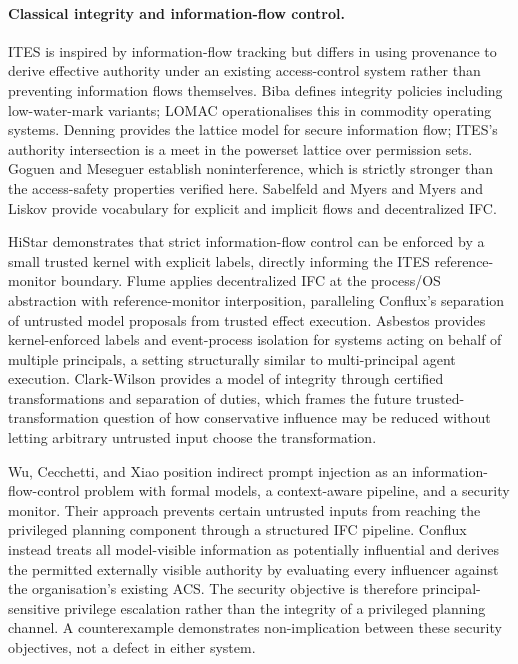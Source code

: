 \documentclass{article}
\begin{document}
\paragraph{Classical integrity and information-flow control.}
ITES is inspired by information-flow tracking but differs in using provenance
to derive effective authority under an existing access-control system rather
than preventing information flows themselves. Biba \citep{biba1977} defines
integrity policies including low-water-mark variants; LOMAC
\citep{lomac2001} operationalises this in commodity operating systems.
Denning \citep{denning1976} provides the lattice model for secure information
flow; ITES's authority intersection is a meet in the powerset lattice over
permission sets. Goguen and Meseguer \citep{goguen1982} establish
noninterference, which is strictly stronger than the access-safety properties
verified here. Sabelfeld and Myers \citep{sabelfeld2003} and Myers and Liskov
\citep{myers1997difc} provide vocabulary for explicit and implicit flows and
decentralized IFC.

HiStar \citep{zeldovich2006histar} demonstrates that strict information-flow
control can be enforced by a small trusted kernel with explicit labels,
directly informing the ITES reference-monitor boundary. Flume
\citep{krohn2007flume} applies decentralized IFC at the process/OS
abstraction with reference-monitor interposition, paralleling Conflux's
separation of untrusted model proposals from trusted effect execution.
Asbestos \citep{efstathopoulos2005asbestos} provides kernel-enforced labels
and event-process isolation for systems acting on behalf of multiple
principals, a setting structurally similar to multi-principal agent execution.
Clark-Wilson \citep{clark1987comparison} provides a model of integrity through
certified transformations and separation of duties, which frames the future
trusted-transformation question of how conservative influence may be
reduced without letting arbitrary untrusted input choose the transformation.

Wu, Cecchetti, and Xiao \citep{wu2024systemleveldefenseindirectprompt}
position indirect prompt injection as an information-flow-control problem
with formal models, a context-aware pipeline, and a security monitor. Their
approach prevents certain untrusted inputs from reaching the privileged
planning component through a structured IFC pipeline. Conflux instead treats
all model-visible information as potentially influential and derives the
permitted externally visible authority by evaluating every influencer against
the organisation's existing ACS. The security objective is therefore
principal-sensitive privilege escalation rather than the integrity of a
privileged planning channel. A counterexample demonstrates non-implication
between these security objectives, not a defect in either system.
\end{document}
